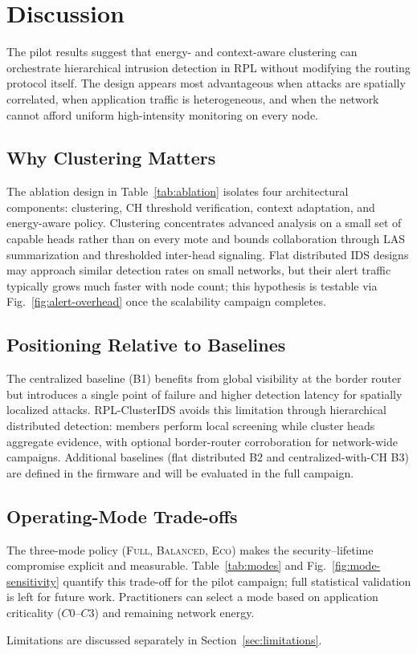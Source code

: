 \section{Discussion}
\label{sec:discussion}

The pilot results suggest that energy- and context-aware clustering can orchestrate hierarchical intrusion detection in RPL without modifying the routing protocol itself.
The design appears most advantageous when attacks are spatially correlated, when application traffic is heterogeneous, and when the network cannot afford uniform high-intensity monitoring on every node.

\subsection{Why Clustering Matters}
The ablation design in Table~\ref{tab:ablation} isolates four architectural components: clustering, CH threshold verification, context adaptation, and energy-aware policy.
Clustering concentrates advanced analysis on a small set of capable heads rather than on every mote and bounds collaboration through LAS summarization and thresholded inter-head signaling.
Flat distributed IDS designs may approach similar detection rates on small networks, but their alert traffic typically grows much faster with node count; this hypothesis is testable via Fig.~\ref{fig:alert-overhead} once the scalability campaign completes.

\subsection{Positioning Relative to Baselines}
The centralized baseline (B1) benefits from global visibility at the border router but introduces a single point of failure and higher detection latency for spatially localized attacks.
RPL-ClusterIDS avoids this limitation through hierarchical distributed detection: members perform local screening while cluster heads aggregate evidence, with optional border-router corroboration for network-wide campaigns.
Additional baselines (flat distributed B2 and centralized-with-CH B3) are defined in the firmware and will be evaluated in the full campaign.

\subsection{Operating-Mode Trade-offs}
The three-mode policy (\textsc{Full}, \textsc{Balanced}, \textsc{Eco}) makes the security--lifetime compromise explicit and measurable.
Table~\ref{tab:modes} and Fig.~\ref{fig:mode-sensitivity} quantify this trade-off for the pilot campaign; full statistical validation is left for future work.
Practitioners can select a mode based on application criticality ($C0$--$C3$) and remaining network energy.

Limitations are discussed separately in Section~\ref{sec:limitations}.
